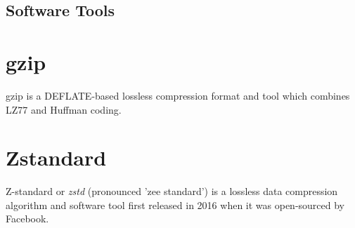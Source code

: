 \subsection{Software Tools}

\section{gzip}
gzip is a DEFLATE-based lossless compression format and tool which combines LZ77 and Huffman coding.

\section{Zstandard}

Z-standard or \textit{zstd} (pronounced 'zee standard') is a lossless data compression algorithm and software tool first released in 2016 when it was open-sourced by Facebook.

